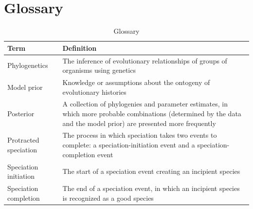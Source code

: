 \documentclass{article}
\begin{document}
\section{Glossary}
\begin{table}
  \centering 
  \begin{tabular}{l p{}}
    \hline
    Term                  & Definition \\
    \hline
    \hline
    Phylogenetics         & The inference of evolutionary relationships of groups of organisms using genetics \\
    Model prior           & Knowledge or assumptions about the ontogeny of evolutionary histories \\
    Posterior             & A collection of phylogenies and parameter estimates, in which more probable combinations (determined by the data and the model prior) are presented more frequently \\
    Protracted speciation & The process in which speciation takes two events to complete: a speciation-initiation event and a speciation-completion event  \\
    Speciation initiation & The start of a speciation event creating an incipient species \\
    Speciation completion & The end of a speciation event, in which an incipient species is recognized as a good species \\
    \hline
  \end{tabular}
  \caption{
    Glossary
  }
  \label{table:glossary}
\end{table}



\end{document}
